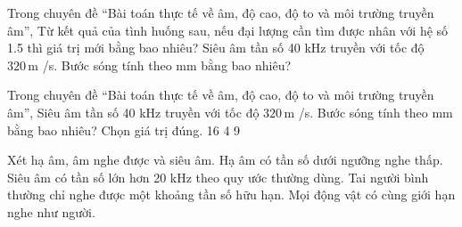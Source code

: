 \begin{ex}
Trong chuyên đề “Bài toán thực tế về âm, độ cao, độ to và môi trường truyền âm”, Từ kết quả của tình huống sau, nếu đại lượng cần tìm được nhân với hệ số 1.5 thì giá trị mới bằng bao nhiêu? Siêu âm tần số 40 kHz truyền với tốc độ $320\,\text{m}$ /s. Bước sóng tính theo mm bằng bao nhiêu?
\end{ex}

\begin{ex}
Trong chuyên đề “Bài toán thực tế về âm, độ cao, độ to và môi trường truyền âm”, Siêu âm tần số 40 kHz truyền với tốc độ $320\,\text{m}$ /s. Bước sóng tính theo mm bằng bao nhiêu? Chọn giá trị đúng.
\choice
{}
{16}
{4}
{9}
\end{ex}

\begin{ex}
Xét hạ âm, âm nghe được và siêu âm.
\choiceTF
{\True Hạ âm có tần số dưới ngưỡng nghe thấp.}
{\True Siêu âm có tần số lớn hơn 20 kHz theo quy ước thường dùng.}
{\True Tai người bình thường chỉ nghe được một khoảng tần số hữu hạn.}
{Mọi động vật có cùng giới hạn nghe như người.}
\end{ex}

